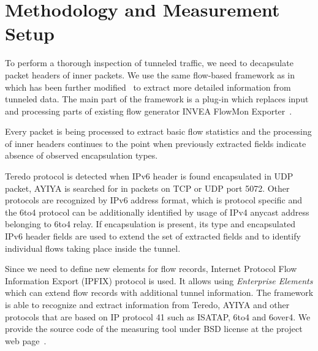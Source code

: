 
\section{Methodology and Measurement Setup} \label{subsec:ipv6-tunnels-met-mon-setup}

To perform a thorough inspection of tunneled traffic, we need to decapsulate packet headers of inner packets. We use the same flow-based framework as in~\cite{elich} which has been further modified~\cite{web} to extract more detailed information from tunneled data. The main part of the framework is a plug-in which replaces input and processing parts of existing flow generator INVEA FlowMon Exporter~\cite{ifp_cp}. 

Every packet is being processed to extract basic flow statistics and the processing of inner headers continues to the point when previously extracted fields indicate absence of observed encapsulation types.

Teredo protocol is detected when IPv6 header is found encapsulated in UDP packet, AYIYA is searched for in packets on TCP or UDP port 5072. Other protocols are recognized by IPv6 address format, which is protocol specific and the 6to4 protocol can be additionally identified by usage of IPv4 anycast address belonging to 6to4 relay. If encapsulation is present, its type and encapsulated IPv6 header fields are used to extend the set of extracted fields and to identify individual flows taking place inside the tunnel. 

Since we need to define new elements for flow records, Internet Protocol Flow Information Export (IPFIX) protocol is used. It allows using \emph{Enterprise Elements} which can extend flow records with additional tunnel information. 
The framework is able to recognize and extract information from Teredo, AYIYA and other protocols that are based on IP protocol 41 such as ISATAP, 6to4 and 6over4. 
We provide the source code of the measuring tool under BSD license at the project web page~\cite{web}.

